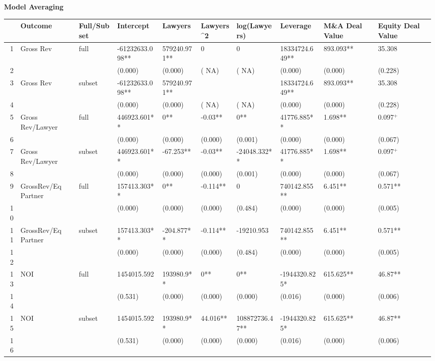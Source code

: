 \documentclass{article}
\begin{document}
\newpage
{\large \textbf{Model Averaging} }%
\begin{table}[H]
\centering
\begin{tabular}{rlllllllll}
  \hline
 & Outcome & Full/Subset & Intercept & Lawyers & Lawyers^2 & log(Lawyers) & Leverage & M\&A Deal Value & Equity Deal Value \\
  \hline
1 & Gross Rev & full & -61232633.098** & 579240.971** & 0 & 0 & 18334724.649** & 893.093** & 35.308 \\
  2 &  &  & (0.000) & (0.000) & (   NA) & (   NA) & (0.000) & (0.000) & (0.228) \\
  3 & Gross Rev & subset & -61232633.098** & 579240.971** &  &  & 18334724.649** & 893.093** & 35.308 \\
  4 &  &  & (0.000) & (0.000) & (   NA) & (   NA) & (0.000) & (0.000) & (0.228) \\
  5 & Gross Rev/Lawyer & full & 446923.601** & 0** & -0.03** & 0** & 41776.885** & 1.698** & 0.097$^{+}$ \\
  6 &  &  & (0.000) & (0.000) & (0.000) & (0.001) & (0.000) & (0.000) & (0.067) \\
  7 & Gross Rev/Lawyer & subset & 446923.601** & -67.253** & -0.03** & -24048.332** & 41776.885** & 1.698** & 0.097$^{+}$ \\
  8 &  &  & (0.000) & (0.000) & (0.000) & (0.001) & (0.000) & (0.000) & (0.067) \\
  9 & GrossRev/Eq Partner & full & 157413.303** & 0** & -0.114** & 0 & 740142.855** & 6.451** & 0.571** \\
  10 &  &  & (0.000) & (0.000) & (0.000) & (0.484) & (0.000) & (0.000) & (0.005) \\
  11 & GrossRev/Eq Partner & subset & 157413.303** & -204.877** & -0.114** & -19210.953 & 740142.855** & 6.451** & 0.571** \\
  12 &  &  & (0.000) & (0.000) & (0.000) & (0.484) & (0.000) & (0.000) & (0.005) \\
  13 & NOI & full & 1454015.592 & 193980.9** & 0** & 0** & -1944320.825* & 615.625** & 46.87** \\
  14 &  &  & (0.531) & (0.000) & (0.000) & (0.000) & (0.016) & (0.000) & (0.006) \\
  15 & NOI & subset & 1454015.592 & 193980.9** & 44.016** & 108872736.47** & -1944320.825* & 615.625** & 46.87** \\
  16 &  &  & (0.531) & (0.000) & (0.000) & (0.000) & (0.016) & (0.000) & (0.006) \\

\end{tabular}
\end{table}
\end{document}
